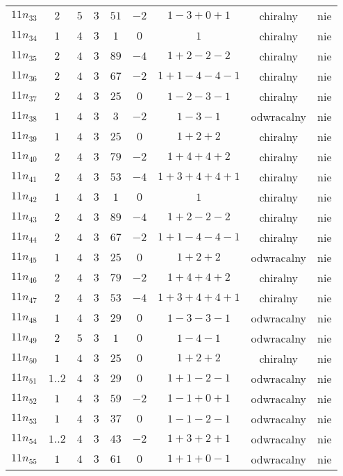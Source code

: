 \begin{longtable}{ccccccccc}
$11n_{33}$ & $2$ & $5$ & $3$ & $51$ & $-2$ & $1-3+0+1$ & chiralny & nie \\
$11n_{34}$ & $1$ & $4$ & $3$ & $1$ & $0$ & $1$ & chiralny & nie \\
$11n_{35}$ & $2$ & $4$ & $3$ & $89$ & $-4$ & $1+2-2-2$ & chiralny & nie \\
$11n_{36}$ & $2$ & $4$ & $3$ & $67$ & $-2$ & $1+1-4-4-1$ & chiralny & nie \\
$11n_{37}$ & $2$ & $4$ & $3$ & $25$ & $0$ & $1-2-3-1$ & chiralny & nie \\
$11n_{38}$ & $1$ & $4$ & $3$ & $3$ & $-2$ & $1-3-1$ & odwracalny & nie \\
$11n_{39}$ & $1$ & $4$ & $3$ & $25$ & $0$ & $1+2+2$ & chiralny & nie \\
$11n_{40}$ & $2$ & $4$ & $3$ & $79$ & $-2$ & $1+4+4+2$ & chiralny & nie \\
$11n_{41}$ & $2$ & $4$ & $3$ & $53$ & $-4$ & $1+3+4+4+1$ & chiralny & nie \\
$11n_{42}$ & $1$ & $4$ & $3$ & $1$ & $0$ & $1$ & chiralny & nie \\
$11n_{43}$ & $2$ & $4$ & $3$ & $89$ & $-4$ & $1+2-2-2$ & chiralny & nie \\
$11n_{44}$ & $2$ & $4$ & $3$ & $67$ & $-2$ & $1+1-4-4-1$ & chiralny & nie \\
$11n_{45}$ & $1$ & $4$ & $3$ & $25$ & $0$ & $1+2+2$ & odwracalny & nie \\
$11n_{46}$ & $2$ & $4$ & $3$ & $79$ & $-2$ & $1+4+4+2$ & chiralny & nie \\
$11n_{47}$ & $2$ & $4$ & $3$ & $53$ & $-4$ & $1+3+4+4+1$ & chiralny & nie \\
$11n_{48}$ & $1$ & $4$ & $3$ & $29$ & $0$ & $1-3-3-1$ & odwracalny & nie \\
$11n_{49}$ & $2$ & $5$ & $3$ & $1$ & $0$ & $1-4-1$ & odwracalny & nie \\
$11n_{50}$ & $1$ & $4$ & $3$ & $25$ & $0$ & $1+2+2$ & chiralny & nie \\
$11n_{51}$ & $1..2$ & $4$ & $3$ & $29$ & $0$ & $1+1-2-1$ & odwracalny & nie \\
$11n_{52}$ & $1$ & $4$ & $3$ & $59$ & $-2$ & $1-1+0+1$ & odwracalny & nie \\
$11n_{53}$ & $1$ & $4$ & $3$ & $37$ & $0$ & $1-1-2-1$ & odwracalny & nie \\
$11n_{54}$ & $1..2$ & $4$ & $3$ & $43$ & $-2$ & $1+3+2+1$ & odwracalny & nie \\
$11n_{55}$ & $1$ & $4$ & $3$ & $61$ & $0$ & $1+1+0-1$ & odwracalny & nie \\

\end{longtable}
